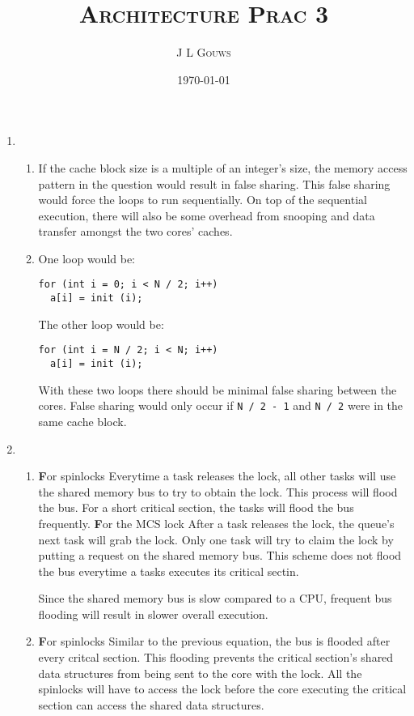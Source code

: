 \documentclass[12pt,a4]{article}
\title{
\textsc{Architecture Prac 3}
}
\author{\textsc{J L Gouws}
}
\date{\today
\\[1cm]}
\begin{document}
\thispagestyle{empty}

\maketitle

\begin{enumerate}
  \item
    \begin{enumerate}
      \item
        If the cache block size is a multiple of an integer's size, the memory access pattern in the question would result in false sharing.
        This false sharing would force the loops to run sequentially.
        On top of the sequential execution, there will also be some overhead from snooping and data transfer amongst the two cores' caches.
      \item
        One loop would be:
        \begin{Verbatim}
for (int i = 0; i < N / 2; i++)
  a[i] = init (i);
        \end{Verbatim}
        The other loop would be:
        \begin{Verbatim}
for (int i = N / 2; i < N; i++)
  a[i] = init (i);
        \end{Verbatim}
        With these two loops there should be minimal false sharing between the cores.
        False sharing would only occur if \verb|N / 2 - 1| and \verb|N / 2| were in the same cache block.
    \end{enumerate}
  \item
    \begin{enumerate}
      \item
        {\textbf For spinlocks}
          Everytime a task releases the lock, all other tasks will use the shared memory bus to try to obtain the lock.
          This process will flood the bus.
          For a short critical section, the tasks will flood the bus frequently.
        {\textbf For the MCS lock}
          After a task releases the lock, the queue's next task will grab the lock.
          Only one task will try to claim the lock by putting a request on the shared memory bus.
          This scheme does not flood the bus everytime a tasks executes its critical sectin.

          Since the shared memory bus is slow compared to a CPU, frequent bus flooding will result in slower overall execution.

      \item
        {\textbf For spinlocks}
          Similar to the previous equation, the bus is flooded after every critcal section.
          This flooding prevents the critical section's shared data structures from being sent to the core with the lock.
          All the spinlocks will have to access the lock before the core executing the critical section can access the shared data structures.


\end{enumerate}
\end{enumerate}
\end{document}

